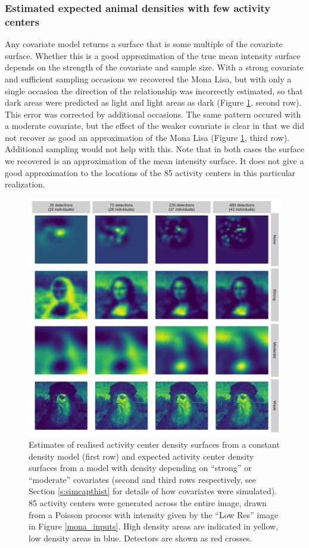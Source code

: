 \documentclass[10pt,a4paper]{article}
\begin{document}
\subsubsection{Estimated expected animal densities with few activity centers}

Any covariate model returns a surface that is some multiple of the covariate surface. Whether this is a good approximation of the true mean intensity surface depends on the strength of the covariate and sample size. With a strong covariate and sufficient sampling occasions we recovered the Mona Lisa, but with only a single occasion the direction of the relationship was incorrectly estimated, so that dark areas were predicted as light and light areas as dark (Figure \ref{peaky}, second row). This error was corrected by additional occasions. The same pattern occured with a moderate covariate, but the effect of the weaker covariate is clear in that we did not recover as good an approximation of the Mona Lisa (Figure \ref{peaky}, third row). Additional sampling would not help with this. Note that in both cases the surface we recovered is an approximation of the mean intensity surface. It does not give a good approximation to the locations of the 85 activity centers in this particular realization.

\begin{figure}[htbp]
\centering
\includegraphics[width=1\textwidth]{mona_peaky.png}
\caption{Estimates of realised activity center density surfaces from a constant density model (first row) and expected activity center density surfaces from a model with density depending on ``strong'' or ``moderate'' covariates (second and third rows respectively, see Section \ref{s:simcapthist} for details of how covariates were simulated). 85 activity centers were generated across the entire image, drawn from a Poisson process with intensity given by the ``Low Res'' image in Figure \ref{mona_inputs}. High density areas are indicated in yellow, low density areas in blue. Detectors are shown as red crosses.}
\label{peaky}
\end{figure}
\end{document}
